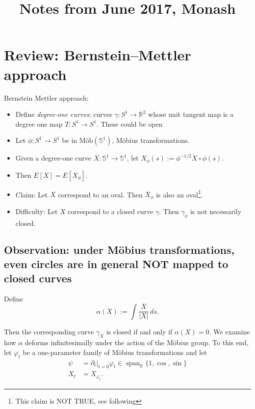 \documentclass[12pt, a4paper]{amsart}
\theoremstyle{remark}
\newcommand{\R}{\mathbb{R}}
\newcommand{\So}{\mathbb{S}^1}
\newcommand{\mobius}{M\"obius}
\begin{document}




\title{Notes from June 2017, Monash}  

\maketitle






\section*{Review:  Bernstein--Mettler approach}
 Bernstein Mettler approach:
\begin{itemize}
\item Define \emph{degree-one curves}:  curves $\gamma:S^1\rightarrow\R^2$ whose unit tangent map is a degree one map $T:S^1\rightarrow S^1$.   These could be open
\item Let $\phi: S^1\rightarrow S^1$ be in $\text{M\"ob}(\So)$, M\"obius transformations.   
\item Given a degree-one curve $X:\So\rightarrow \So$, let $X_\phi(s):= \phi^{-1/2} X\circ \phi(s)$.    
\item Then $E[X]=E[X_\phi]$.
\item Claim:  Let $X$ correspond to an oval.   Then $X_\phi$ is also an oval\footnote{This claim is NOT TRUE, see following}.
\item Difficulty:   Let $X$ correspond to a closed curve $\gamma$.  Then $\gamma_\phi$ is not necessarily closed.
\end{itemize}

\subsection*{Observation:   under  M\"obius transformations, even circles are in general NOT mapped to closed curves}

Define
\[
\alpha(X) := \int \frac{X}{|X|}\,ds.
\]

Then the corresponding curve \(\gamma_X\) is closed if and only if \(\alpha(X) = 0\). We examine how \(\alpha\) deforms infinitesimally under the action of the \mobius{} group. To this end, let \(\varphi_t\) be a one-parameter family of \mobius{} transformations and let
\begin{align*}
\psi &= \partial_t|_{t=0} \varphi_t \in \operatorname{span}_{\mathbb{R}} \lbrace 1, \cos, \sin \rbrace \\
X_t &= X_{\varphi_t}.
\end{align*}
\end{document}

